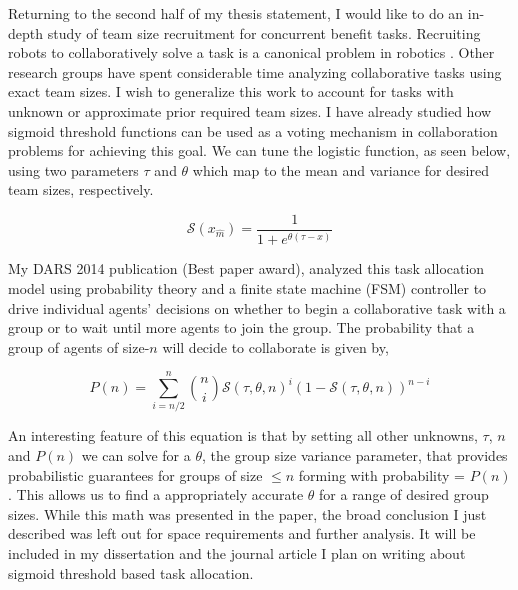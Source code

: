 \documentclass[11pt, onecolumn, compsoc, letterpaper]{article}
\newcommand{\sig}{\mathcal{S}}
\newcommand{\xm}{x_{\hat{m}}}
\begin{document}
Returning to the second half of my thesis statement, I would like to do an in-depth study of team size recruitment for concurrent benefit tasks.  Recruiting robots to collaboratively solve a task is a canonical problem in robotics \cite{Gerkey2004}. Other research groups have spent considerable time analyzing \cite{Martinoli2004, Martinoli1995, Lerman2001} collaborative tasks using exact team sizes. I wish to generalize this work to account for tasks with unknown or approximate prior required team sizes. I have already studied how sigmoid threshold functions can be used as a voting mechanism in collaboration problems for achieving this goal. We can tune the logistic function, as seen below, using two parameters $\tau$ and $\theta$ which map to the mean and variance for desired team sizes, respectively.

\begin{equation}
	\sig(\xm) = \frac{1}{1 + e^{\theta(\tau - x)}}
\end{equation}\label{eq:sigmoid}

My DARS 2014 publication (Best paper award), analyzed this task allocation model using probability theory and a finite state machine (FSM) controller to drive individual agents' decisions on whether to begin a collaborative task with a group or to wait until more agents to join the group. The probability that a group of agents of size-$n$ will decide to collaborate is given by,

\begin{equation}
	P(n) = \sum\limits_{i={n/2}}^{n}\binom{n}{i}\sig(\tau, \theta, n)^{i}\left(1 - \sig(\tau, \theta, n)\right)^{n - i}
\end{equation}\label{eq:cdf}

An interesting feature of this equation is that by setting all other unknowns, $\tau$, $n$ and $P(n)$ we can solve for a $\theta$, the group size variance parameter, that provides probabilistic guarantees for groups of size $\leq n$ forming with probability = $P(n)$. This allows us to find a appropriately accurate $\theta$ for a range of desired group sizes. While this math was presented in the paper, the broad conclusion I just described was left out for space requirements and further analysis. It will be included in my dissertation and the journal article I plan on writing about sigmoid threshold based task allocation. 
\end{document}
